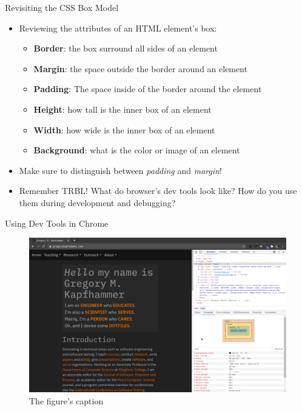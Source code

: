 \documentclass[14pt,aspectratio=169]{beamer}
\begin{document}
%
\begin{frame}{Revisiting the CSS Box Model}
  \begin{itemize}
    \item Reviewing the attributes of an HTML element's box:
      \begin{itemize}
        \item {\bf Border}: the box surround all sides of an element
        \item {\bf Margin}: the space outside the border around an element
        \item {\bf Padding}: The space inside of the border around the element
        \item {\bf Height}: how tall is the inner box of an element
        \item {\bf Width}: how wide is the inner box of an element
        \item {\bf Background}: what is the color or image of an element
      \end{itemize}
      \vspace*{-.2in}
    \item Make sure to distinguish between {\em padding} and {\em margin}!
      \vspace*{-.2in}
    \item Remember TRBL! What do browser's dev tools look like? How do
      you use them during development and debugging?
  \end{itemize}
\end{frame}

\begin{frame}{Using Dev Tools in Chrome}
  \begin{figure}
    \centering
    \includegraphics[scale=.085]{images/chrome-dev-tools.png}
    \caption{The figure's caption}
  \end{figure}
\end{frame}
\end{document}
